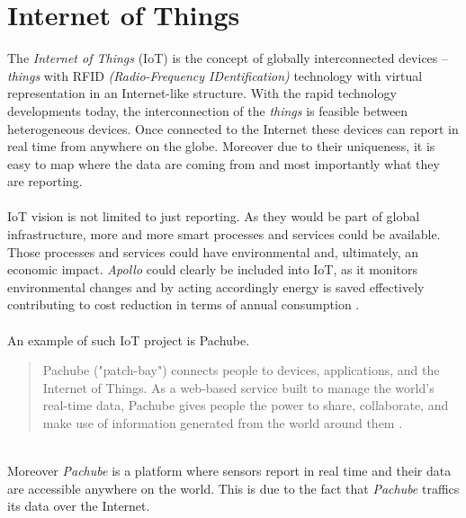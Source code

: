\documentclass[12pt,a4paper]{report}
\begin{document}
\section{Internet of Things}
The \textit{Internet of Things} (IoT) is the concept of globally interconnected devices -- \textit{things} with RFID \textit{(Radio-Frequency IDentification)} technology with virtual representation in an Internet-like structure. 
With the rapid technology developments today, the interconnection of the \textit{things} is feasible between heterogeneous devices. Once connected to the Internet these devices can report in real time from anywhere on the globe. Moreover due to their uniqueness, it is easy to map where the data are coming from and most importantly what they are reporting\cite{website:iot}.\\
\ \\
IoT vision is not limited to just reporting. As they would be part of global infrastructure, more and more smart processes and services could be available. Those processes and services could have environmental and, ultimately, an economic impact. \emph{Apollo} could clearly be included into IoT, as it monitors environmental changes and by acting accordingly energy is saved effectively contributing to cost reduction in terms of annual consumption \cite{iotconference}.\\
\ \\
An example of such IoT project is Pachube.
\begin{quote} 
    Pachube ("patch-bay") connects people to devices, applications, and the Internet of Things. As a web-based service built to manage the world's real-time data, Pachube gives people the power to share, collaborate, and make use of information generated from the world around them \cite{website:pachube}.
\end{quote}
\ \\
Moreover \textit{Pachube} is a platform where sensors report in real time and their data are accessible anywhere on the world. This is due to the fact that \textit{Pachube} traffics its data over the Internet.
%
\end{document}
